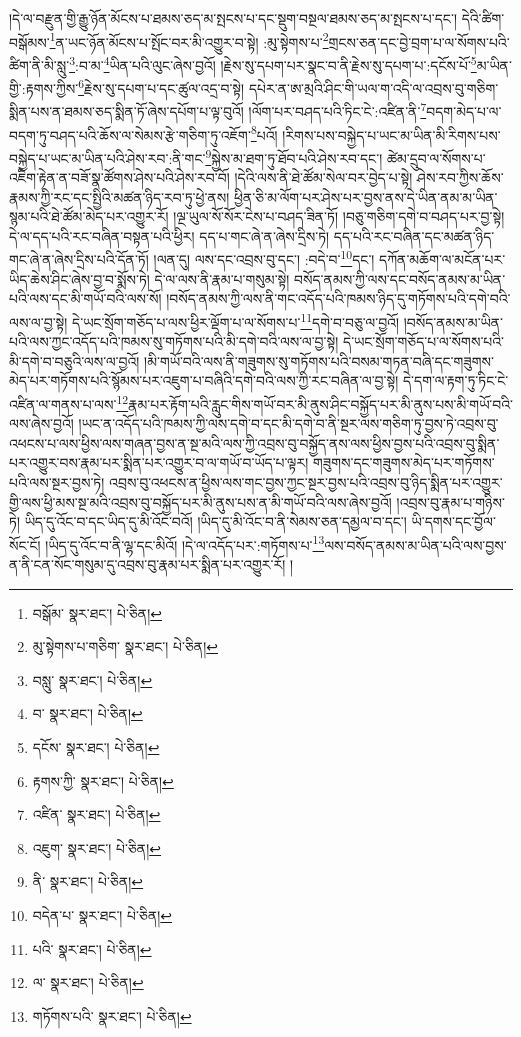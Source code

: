 །དེ་ལ་བརྫུན་གྱི་རྒྱུ་ཉོན་མོངས་པ་ཐམས་ཅད་མ་སྤངས་པ་དང་སྡུག་བསྔལ་ཐམས་ཅད་མ་སྤངས་པ་དང་། དེའི་ཚིག་བསྒོམས་\footnote{བསྒོམ་  སྣར་ཐང་།  པེ་ཅིན། }ན་ཡང་ཉོན་མོངས་པ་སྤོང་བར་མི་འགྱུར་བ་སྟེ། :མུ་སྟེགས་པ་\footnote{མུ་སྟེགས་པ་གཅིག་  སྣར་ཐང་།  པེ་ཅིན། }གྲངས་ཅན་དང་བྱེ་བྲག་པ་ལ་སོགས་པའི་ཚིག་ནི་མི་སླུ་\footnote{བསླུ་  སྣར་ཐང་།  པེ་ཅིན། }:བ་མ་\footnote{བ་  སྣར་ཐང་།  པེ་ཅིན། }ཡིན་པའི་ལུང་ཞེས་བྱའོ། །རྗེས་སུ་དཔག་པར་སྣང་བ་ནི་རྗེས་སུ་དཔག་པ་:དངོས་པོ་\footnote{དངོས་  སྣར་ཐང་།  པེ་ཅིན། }མ་ཡིན་གྱི་:རྟགས་ཀྱིས་\footnote{རྟགས་ཀྱི་  སྣར་ཐང་།  པེ་ཅིན། }རྗེས་སུ་དཔག་པ་དང་ཚུལ་འདྲ་བ་སྟེ། དཔེར་ན་ཨ་མྲའི་ཤིང་གི་ཡལ་ག་འདི་ལ་འབྲས་བུ་གཅིག་སྨིན་པས་ན་ཐམས་ཅད་སྨིན་ཏོ་ཞེས་དཔོག་པ་ལྟ་བུའོ། །ལོག་པར་བཤད་པའི་ཏིང་ངེ་:འཛིན་ནི་\footnote{འཛིན་  སྣར་ཐང་།  པེ་ཅིན། }བདག་མེད་པ་ལ་བདག་ཏུ་བཤད་པའི་ཆོས་ལ་སེམས་རྩེ་གཅིག་ཏུ་འཇོག་\footnote{འཇུག་  སྣར་ཐང་།  པེ་ཅིན། }པའོ། །རིགས་པས་བསྐྱེད་པ་ཡང་མ་ཡིན་མི་རིགས་པས་བསྐྱེད་པ་ཡང་མ་ཡིན་པའི་ཤེས་རབ་:ནི་གང་\footnote{ནི་  སྣར་ཐང་།  པེ་ཅིན། }སྐྱེས་མ་ཐག་ཏུ་ཐོབ་པའི་ཤེས་རབ་དང་། ཚེམ་དྲུབ་ལ་སོགས་པ་འཇིག་རྟེན་ན་བཟོ་སྣ་ཚོགས་ཤེས་པའི་ཤེས་རབ་བོ། །དེའི་ལས་ནི་ཐེ་ཚོམ་སེལ་བར་བྱེད་པ་སྟེ། ཤེས་རབ་ཀྱིས་ཆོས་རྣམས་ཀྱི་རང་དང་སྤྱིའི་མཚན་ཉིད་རབ་ཏུ་ཕྱེ་ནས། ཕྱིན་ཅི་མ་ལོག་པར་ཤེས་པར་བྱས་ནས་དེ་ཡིན་ནམ་མ་ཡིན་སྙམ་པའི་ཐེ་ཚོམ་མེད་པར་འགྱུར་རོ། །ལྔ་ཡུལ་སོ་སོར་ངེས་པ་བཤད་ཟིན་ཏོ། །བཅུ་གཅིག་དགེ་བ་བཤད་པར་བྱ་སྟེ། དེ་ལ་དད་པའི་རང་བཞིན་བསྟན་པའི་ཕྱིར། དད་པ་གང་ཞེ་ན་ཞེས་དྲིས་ཏེ། དད་པའི་རང་བཞིན་དང་མཚན་ཉིད་གང་ཞེ་ན་ཞེས་དྲིས་པའི་དོན་ཏོ། །ལན་དུ། ལས་དང་འབྲས་བུ་དང་། :བདེ་བ་\footnote{བདེན་པ་  སྣར་ཐང་།  པེ་ཅིན། }དང་། དཀོན་མཆོག་ལ་མངོན་པར་ཡིད་ཆེས་ཤིང་ཞེས་བྱ་བ་སྨོས་ཏེ། དེ་ལ་ལས་ནི་རྣམ་པ་གསུམ་སྟེ། བསོད་ནམས་ཀྱི་ལས་དང་བསོད་ནམས་མ་ཡིན་པའི་ལས་དང་མི་གཡོ་བའི་ལས་སོ། །བསོད་ནམས་ཀྱི་ལས་ནི་གང་འདོད་པའི་ཁམས་ཉིད་དུ་གཏོགས་པའི་དགེ་བའི་ལས་ལ་བྱ་སྟེ། དེ་ཡང་སྲོག་གཅོད་པ་ལས་ཕྱིར་ལྡོག་པ་ལ་སོགས་པ་\footnote{པའི་  སྣར་ཐང་།  པེ་ཅིན། }དགེ་བ་བཅུ་ལ་བྱའོ། །བསོད་ནམས་མ་ཡིན་པའི་ལས་ཀྱང་འདོད་པའི་ཁམས་སུ་གཏོགས་པའི་མི་དགེ་བའི་ལས་ལ་བྱ་སྟེ། དེ་ཡང་སྲོག་གཅོད་པ་ལ་སོགས་པའི་མི་དགེ་བ་བཅུའི་ལས་ལ་བྱའོ། །མི་གཡོ་བའི་ལས་ནི་གཟུགས་སུ་གཏོགས་པའི་བསམ་གཏན་བཞི་དང་གཟུགས་མེད་པར་གཏོགས་པའི་སྙོམས་པར་འཇུག་པ་བཞིའི་དགེ་བའི་ལས་ཀྱི་རང་བཞིན་ལ་བྱ་སྟེ། དེ་དག་ལ་རྟག་ཏུ་ཏིང་ངེ་འཛིན་ལ་གནས་པ་ལས་\footnote{ལ་  སྣར་ཐང་།  པེ་ཅིན། }རྣམ་པར་རྟོག་པའི་རླུང་གིས་གཡོ་བར་མི་ནུས་ཤིང་བསྐྱོད་པར་མི་ནུས་པས་མི་གཡོ་བའི་ལས་ཞེས་བྱའོ། །ཡང་ན་འདོད་པའི་ཁམས་ཀྱི་ལས་དགེ་བ་དང་མི་དགེ་བ་ནི་སྔར་ལས་གཅིག་ཏུ་བྱས་ཏེ་འབྲས་བུ་འཕངས་པ་ལས་ཕྱིས་ལས་གཞན་བྱས་ན་སྔ་མའི་ལས་ཀྱི་འབྲས་བུ་བསྐྱོད་ནས་ལས་ཕྱིས་བྱས་པའི་འབྲས་བུ་སྨིན་པར་འགྱུར་བས་རྣམ་པར་སྨིན་པར་འགྱུར་བ་ལ་གཡོ་བ་ཡོད་པ་ལྟར། གཟུགས་དང་གཟུགས་མེད་པར་གཏོགས་པའི་ལས་སྔར་བྱས་ཏེ། འབྲས་བུ་འཕངས་ན་ཕྱིས་ལས་གང་བྱས་ཀྱང་སྔར་བྱས་པའི་འབྲས་བུ་ཉིད་སྨིན་པར་འགྱུར་གྱི་ལས་ཕྱི་མས་སྔ་མའི་འབྲས་བུ་བསྐྱོད་པར་མི་ནུས་པས་ན་མི་གཡོ་བའི་ལས་ཞེས་བྱའོ། །འབྲས་བུ་རྣམ་པ་གཉིས་ཏེ། ཡིད་དུ་འོང་བ་དང་ཡིད་དུ་མི་འོང་བའོ། །ཡིད་དུ་མི་འོང་བ་ནི་སེམས་ཅན་དམྱལ་བ་དང་། ཡི་དགས་དང་བྱོལ་སོང་ངོ། །ཡིད་དུ་འོང་བ་ནི་ལྷ་དང་མིའོ། །དེ་ལ་འདོད་པར་:གཏོགས་པ་\footnote{གཏོགས་པའི་  སྣར་ཐང་།  པེ་ཅིན། }ལས་བསོད་ནམས་མ་ཡིན་པའི་ལས་བྱས་ན་ནི་ངན་སོང་གསུམ་དུ་འབྲས་བུ་རྣམ་པར་སྨིན་པར་འགྱུར་རོ། །
